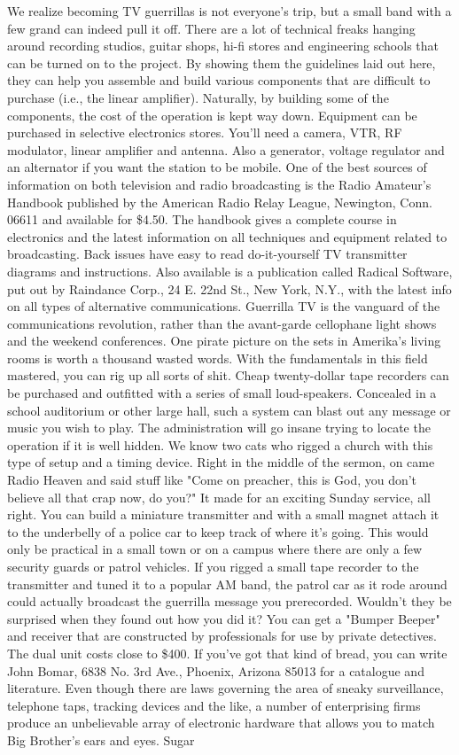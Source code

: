 \documentclass[11pt,twoside,a4paper]{book}
\begin{document}
We realize becoming TV guerrillas is not everyone's trip, but a small band with a few grand can indeed pull it off. There are a lot of technical freaks hanging around recording studios, guitar shops, hi-fi stores and engineering schools that can be turned on to the project. By showing them the guidelines laid out here, they can help you assemble and build various components that are difficult to purchase (i.e., the linear amplifier). Naturally, by building some of the components, the cost of the operation is kept way down. Equipment can be purchased in selective electronics stores. You'll need a camera, VTR, RF modulator, linear amplifier and antenna. Also a generator, voltage regulator and an alternator if you want the station to be mobile. One of the best sources of information on both television and radio broadcasting is the Radio Amateur's Handbook published by the American Radio Relay League, Newington, Conn. 06611 and available for \$4.50. The handbook gives a complete course in electronics and the latest information on all techniques and equipment related to broadcasting. Back issues have easy to read do-it-yourself TV transmitter diagrams and instructions. Also available is a publication called Radical Software, put out by Raindance Corp., 24 E. 22nd St., New York, N.Y., with the latest info on all types of alternative communications. Guerrilla TV is the vanguard of the communications revolution, rather than the avant-garde cellophane light shows and the weekend conferences. One pirate picture on the sets in Amerika's living rooms is worth a thousand wasted words. With the fundamentals in this field mastered, you can rig up all sorts of shit. Cheap twenty-dollar tape recorders can be purchased and outfitted with a series of small loud-speakers. Concealed in a school auditorium or other large hall, such a system can blast out any message or music you wish to play. The administration will go insane trying to locate the operation if it is well hidden. We know two cats who rigged a church with this type of setup and a timing device. Right in the middle of the sermon, on came Radio Heaven and said stuff like "Come on preacher, this is God, you don't believe all that crap now, do you?" It made for an exciting Sunday service, all right. You can build a miniature transmitter and with a small magnet attach it to the underbelly of a police car to keep track of where it's going. This would only be practical in a small town or on a campus where there are only a few security guards or patrol vehicles. If you rigged a small tape recorder to the transmitter and tuned it to a popular AM band, the patrol car as it rode around could actually broadcast the guerrilla message you prerecorded. Wouldn't they be surprised when they found out how you did it? You can get a "Bumper Beeper" and receiver that are constructed by professionals for use by private detectives. The dual unit costs close to \$400. If you've got that kind of bread, you can write John Bomar, 6838 No. 3rd Ave., Phoenix, Arizona 85013 for a catalogue and literature. Even though there are laws governing the area of sneaky surveillance, telephone taps, tracking devices and the like, a number of enterprising firms produce an unbelievable array of electronic hardware that allows you to match Big Brother's ears and eyes. Sugar 
\end{document}
